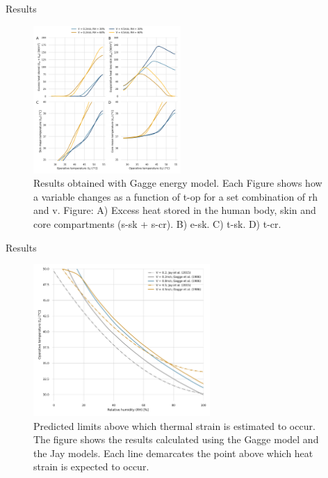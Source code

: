\documentclass[aspectratio=169]{beamer}
\begin{document}
    \begin{frame}{Results}
        \begin{figure}[thb!]
            \centering
            \includegraphics[width=0.5\textwidth]{figures/results_model_2}
            \caption{Results obtained with Gagge energy model.
            Each Figure shows how a variable changes as a function of \ac{t-op} for a set combination of \ac{rh} and \ac{v}.
            Figure: A)  Excess heat stored in the human body, skin and core compartments (\ac{s-sk} + \ac{s-cr}).
            B) \Acf{e-sk}.
            C) \Acf{t-sk}.
            D) \Acf{t-cr}.}
            \label{fig:results_model_2}
        \end{figure}
    \end{frame}

    \begin{frame}{Results}
        \begin{figure}[thb!]
            \centering
            \includegraphics[width=0.6\textwidth]{figures/comparison_air_speed}
            \caption{Predicted limits above which thermal strain is estimated to occur.
            The figure shows the results calculated using the Gagge model and the Jay models.
            Each line demarcates the point above which heat strain is expected to occur.}
            \label{fig:comparison_air_speed}
        \end{figure}
    \end{frame}
\end{document}
